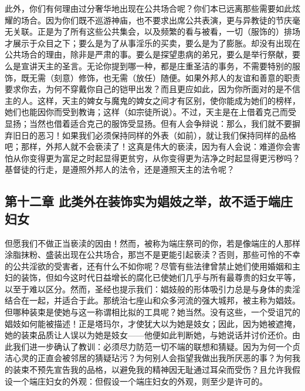 此外，你们有何理由过分奢华地出现在公共场合呢？你们本已远离那些需要如此炫耀的场合。因为你们既不巡游神庙，也不要求出席公共表演，更与异教徒的节庆毫无关联。正是为了所有这些公共集会，以及频繁的看与被看，一切（服饰的）排场才展示于众目之下；要么是为了从事淫乐的买卖，要么是为了膨胀。却没有出现在公共场合的理由，除非是严肃的事。要么是探望患病的弟兄，要么是举行祭献，要么是宣讲天主的圣言。无论你提到哪一种，都是庄重圣洁的事务，不需要特别的服饰，既无需（刻意）修饰，也无需（放任）随便。如果外邦人的友谊和善意的职责要求你去，为何不穿戴你自己的铠甲出发？而且更应如此，因为你所面对的是不信主的人。这样，天主的婢女与魔鬼的婢女之间才有区别，使你能成为她们的榜样，她们也能因你而受到教诲；这样（如宗徒所说）。不过，天主是在上借着克己而受显扬；当然也借着适合克己的服饰受显扬。但有人会争辩说：那么，我们就不要摒弃旧日的恶习！如果我们必须保持同样的外表（如前），就让我们保持同样的品格吧；那样，外邦人就不会亵渎了！这真是伟大的亵渎，因为有人会说：难道你会害怕从你变得更为富足之时起显得更贫穷，从你变得更为洁净之时起显得更污秽吗？基督徒的行走，是遵照外邦人的法令，还是遵照天主的法令呢？\par


\subsection{第十二章 此类外在装饰实为娼妓之举，故不适于端庄妇女}

但愿我们不做正当亵渎的因由！然而，被称为端庄祭司的你，若是像端庄的人那样涂脂抹粉、盛装出现在公共场合，那岂不是更能引起亵渎？否则，那些可怜的不幸的公共淫欲的受害者，还有什么不如你呢？尽管有些法律曾禁止她们使用婚姻和主妇的装饰，但如今这时代日益增长的腐化已使她们几乎与所有最尊贵的妇女平等，以至于难以区分。然而，圣经也提示我们：娼妓般的形体吸引力总是与身体的卖淫结合在一起，并适合于此。那统治七座山和众多河流的强大城邦，被主称为娼妓。但哪种装束是使她与这一称谓相比拟的工具呢？她当然。没有这些，一个受诅咒的娼妓如何能被描述！正是塔玛尔，才使犹大以为她是妓女；因此，因为她被遮掩，她的装束品质让人误以为她是妓女——他便如此判断她，与她说话并讨价还价。由此我们进一步确认了教训：必须尽力防范一切不端的联想和猜疑。因为为何一个贞洁心灵的正直会被邻居的猜疑玷污？为何别人会指望我做出我所厌恶的事？为何我的装束不预先宣告我的品格，以避免我的精神因无耻通过耳朵而受伤？且允许我假设一个端庄妇女的外观：但假设一个端庄妇女的外观，则至少是许可的。\par

